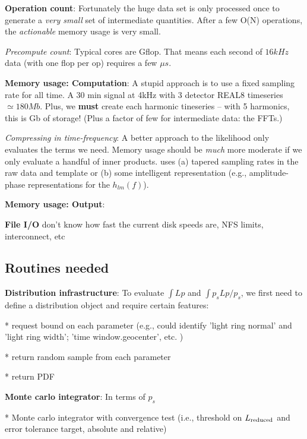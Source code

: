 \documentclass[twocolumn,prd,nofootinbib]{revtex4}
\newcommand\editremark[1]{{\color{red} #1}}
\begin{document}
\begin{widetext}
\noindent \textbf{Operation count}: Fortunately the huge data set is only processed once to generate a \emph{very small}
set of intermediate quantities.  After a few O(N) operations, the \emph{actionable} memory usage is very small.


\noindent \emph{Precompute count}: Typical cores are Gflop.  That means each second of $16kHz$ data (with one flop per
op) requires a few $\mu s$.   

\noindent \textbf{Memory usage: Computation}: A stupid approach is to use a fixed sampling rate for all time.
%
A 30 min signal at 4kHz with 3 detector REAL8 timeseries $\simeq 180 Mb$.
Plus, we \textbf{must} create each harmonic tineseries -- with 5 harmonics, this is Gb of storage!  (Plus a factor of few for intermediate
data: the FFTs.)

\noindent \emph{Compressing in time-frequency}: A better approach to the likelihood only evaluates the terms we need.
Memory usage should be \emph{much} more moderate if we only evaluate a handful of inner products. uses (a) tapered sampling rates in
the raw data and template or (b) some intelligent representation (e.g., amplitude-phase representations for the $h_{lm}(f)$).

\noindent \textbf{Memory usage: Output}: 

\noindent \textbf{File I/O} \editremark{don't know} how fast the current disk speeds are, NFS limits, interconnect, etc


\subsection{Routines needed}

\noindent \textbf{Distribution infrastructure}: To evaluate $\int L p$ and $\int p_s L p/p_s$, we first need to define
a distribution object and require certain features:

* request bound on each parameter (e.g., could identify 'light ring normal' and 'light ring width'; 'time
window.geocenter', etc. )

* return random sample from each parameter

* return PDF


\noindent \textbf{Monte carlo integrator}: In terms of $p_s$

* Monte carlo integrator with convergence test (i.e., threshold on $L_{\rm reduced}$ and error tolerance target,
absolute and relative)


\end{widetext}
\end{document}
